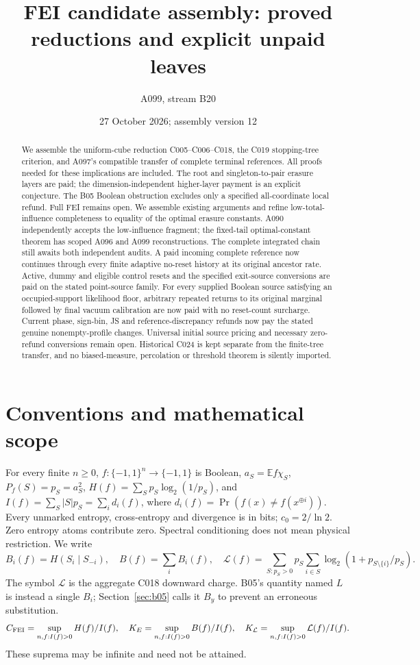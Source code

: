 \documentclass[11pt]{article}
\title{FEI candidate assembly: proved reductions and explicit unpaid leaves}
\author{A099, stream B20}
\date{27 October 2026; assembly version 12}
\newcommand{\E}{\mathbb E}
\begin{document}
\maketitle
\begin{abstract}
We assemble the uniform-cube reduction C005--C006--C018, the
C019 stopping-tree criterion, and A097's compatible transfer of complete
terminal references. All proofs needed for these implications are included.
The root and singleton-to-pair erasure layers are paid; the
dimension-independent higher-layer payment is an explicit conjecture.
The B05 Boolean obstruction excludes only a specified all-coordinate local
refund. Full FEI remains open. We assemble existing arguments and refine
low-total-influence completeness to equality of the optimal erasure constants.
A090 independently accepts the low-influence fragment; the fixed-tail
optimal-constant theorem has scoped A096 and A099 reconstructions.
The complete integrated chain still awaits both independent audits.
A paid incoming complete reference now continues through every finite
adaptive no-reset history at its original ancestor rate. Active, dummy and eligible control resets and the specified exit-source
conversions are paid on the stated point-source family. For every supplied Boolean source satisfying an occupied-support likelihood
floor, arbitrary repeated returns to its original marginal followed by
final vacuum calibration are now paid with no reset-count surcharge.
Current phase, sign-bin, JS and reference-discrepancy refunds now pay
the stated genuine nonempty-profile changes. Universal initial source
pricing and necessary zero-refund conversions remain open.
Historical C024 is kept separate from the
finite-tree transfer, and no biased-measure, percolation or threshold theorem
is silently imported.
\end{abstract}

\section{Conventions and mathematical scope}
For every finite $n\ge0$, $f:\{-1,1\}^n\to\{-1,1\}$ is Boolean,
$a_S=\E f\chi_S$, $P_f(S)=p_S=a_S^2$,
$H(f)=\sum_Sp_S\log_2(1/p_S)$, and
$I(f)=\sum_S|S|p_S=\sum_i d_i(f)$, where
$d_i(f)=\Pr(f(x)\ne f(x^{\oplus i}))$.
Every unmarked entropy, cross-entropy and divergence is in bits;
$c_0=2/\ln2$. Zero entropy atoms contribute zero. Spectral conditioning
does not mean physical restriction. We write
\[
 B_i(f)=H(S_i\mid S_{-i}),\quad B(f)=\sum_i B_i(f),\quad
 \mathcal L(f)=\sum_{S:p_S>0}p_S\sum_{i\in S}
                    \log_2(1+p_{S\setminus\{i\}}/p_S).
\]
The symbol $\mathcal L$ is the aggregate C018 downward charge. B05's
quantity named $L$ is instead a single $B_i$; Section~\ref{sec:b05}
calls it $B_y$ to prevent an erroneous substitution.
\[
C_{\rm FEI}=\sup_{n,f:I(f)>0} H(f)/I(f),\quad
K_E=\sup_{n,f:I(f)>0} B(f)/I(f),\quad
K_{\mathcal L}=\sup_{n,f:I(f)>0}\mathcal L(f)/I(f).
\]
These suprema may be infinite and need not be attained.
\end{document}
